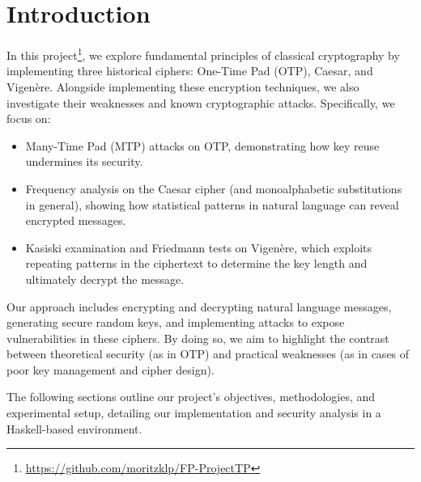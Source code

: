 \section{Introduction}
In this project\footnote{\url{https://github.com/moritzklp/FP-ProjectTP}}, we explore fundamental principles of classical cryptography by implementing three historical ciphers: One-Time Pad (OTP), Caesar, and Vigenère. 
Alongside implementing these encryption techniques, we also investigate their weaknesses and known cryptographic attacks. 
Specifically, we focus on:

\begin{itemize}
    \item Many-Time Pad (MTP) attacks on OTP, demonstrating how key reuse undermines its security.
    \item Frequency analysis on the Caesar cipher (and monoalphabetic substitutions in general), 
    showing how statistical patterns in natural language can reveal encrypted messages.
    \item Kasiski examination and Friedmann tests on Vigenère, 
    which exploits repeating patterns in the ciphertext to determine the key length and ultimately decrypt the message.
\end{itemize}

Our approach includes encrypting and decrypting natural language messages, generating secure random keys, 
and implementing attacks to expose vulnerabilities in these ciphers. 
By doing so, we aim to highlight the contrast between theoretical security (as in OTP) 
and practical weaknesses (as in cases of poor key management and cipher design).

The following sections outline our project’s objectives, methodologies, and experimental setup, 
detailing our implementation and security analysis in a Haskell-based environment.
